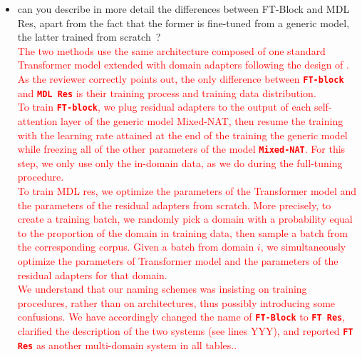 \documentclass[12pt,times,a4paper,twoside]{article}
\newcommand{\fyTodo}[1]{\Todo[FY:]{\textcolor{orange}{#1}}}
\theoremstyle{definition}
\newcommand{\system}[1]{\texttt{\textbf{#1}}}
\begin{document}
\begin{itemize}
\item can you describe in more detail the differences between FT-Block and MDL Res, apart from the fact that the former is fine-tuned from a generic model, the latter trained from scratch~?
  \\
  \textcolor{red}{%
    The two methods use the same architecture composed of one standard Transformer model extended with domain adapters following the design of \cite{Bapna19simple}. As the reviewer correctly points out, the only difference between \system{FT-block} and \system{MDL Res} is their training process and training data distribution.
    \\
    To train \system{FT-block}, we plug residual adapters to the output of each self-attention layer of the generic model Mixed-NAT, then resume the training with the learning rate attained at the end of the training the generic model while freezing all of the other parameters of the model \system{Mixed-NAT}. For this step, we only use only the in-domain data, as we do during the full-tuning procedure.
    \\
    To train MDL res, we optimize the parameters of the Transformer model and the parameters of the residual adapters from scratch. More precisely, to create a training batch, we randomly pick a domain with a probability equal to the proportion of the domain in training data, then sample a batch from the corresponding corpus. Given a batch from domain $i$, we simultaneously optimize the parameters of Transformer model and the parameters of the residual adapters for that domain.
    \\
    We understand that our naming schemes was insisting on training procedures, rather than on architectures, thus possibly introducing some confusions. We have accordingly changed the name of \system{FT-Block} to \system{FT Res}, clarified the description of the two systems (see lines YYY\fyTodo{fix this}), and reported \system{FT Res}\fyTodo{or new name} as another multi-domain system in all tables.\fyTodo{Make sure it is the case}.}
\end{itemize}
\end{document}
